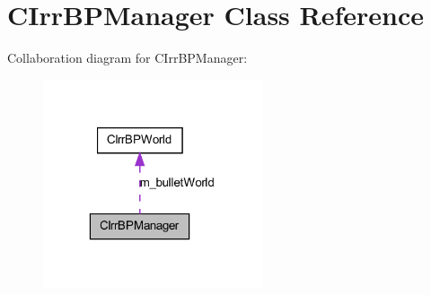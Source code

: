 \hypertarget{class_c_irr_b_p_manager}{
\section{CIrrBPManager Class Reference}
\label{class_c_irr_b_p_manager}
}


Collaboration diagram for CIrrBPManager:\nopagebreak
\begin{figure}[H]
\begin{center}
\leavevmode
\includegraphics[width=184pt]{class_c_irr_b_p_manager__coll__graph}
\end{center}
\end{figure}
